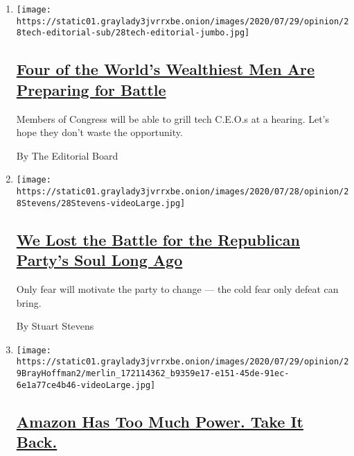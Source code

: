 \begin{enumerate}
\def\labelenumi{\arabic{enumi}.}
\item
  \texttt{[image: https://static01.graylady3jvrrxbe.onion/images/2020/07/29/opinion/28tech-editorial-sub/28tech-editorial-jumbo.jpg]}

  \hypertarget{four-of-the-worlds-wealthiest-men-are-preparing-for-battle}{%
  \subsection{\texorpdfstring{\href{/2020/07/28/opinion/tech-ceo-hearing-congress.html}{Four
  of the World's Wealthiest Men Are Preparing for
  Battle}}{Four of the World's Wealthiest Men Are Preparing for Battle}}\label{four-of-the-worlds-wealthiest-men-are-preparing-for-battle}}

  Members of Congress will be able to grill tech C.E.O.s at a hearing.
  Let's hope they don't waste the opportunity.

  By The Editorial Board
\item
  \texttt{[image: https://static01.graylady3jvrrxbe.onion/images/2020/07/28/opinion/28Stevens/28Stevens-videoLarge.jpg]}

  \hypertarget{we-lost-the-battle-for-the-republican-partys-soul-long-ago}{%
  \subsection{\texorpdfstring{\href{/2020/07/29/opinion/trump-republican-party-racism.html}{We
  Lost the Battle for the Republican Party's Soul Long
  Ago}}{We Lost the Battle for the Republican Party's Soul Long Ago}}\label{we-lost-the-battle-for-the-republican-partys-soul-long-ago}}

  Only fear will motivate the party to change --- the cold fear only
  defeat can bring.

  By Stuart Stevens
\item
  \texttt{[image: https://static01.graylady3jvrrxbe.onion/images/2020/07/29/opinion/29BrayHoffman2/merlin\_172114362\_b9359e17-e151-45de-91ec-6e1a77ce4b46-videoLarge.jpg]}

  \hypertarget{amazon-has-too-much-power-take-it-back}{%
  \subsection{\texorpdfstring{\href{/2020/07/29/opinion/amazon-union-congress-antitrust.html}{Amazon
  Has Too Much Power. Take It
  Back.}}{Amazon Has Too Much Power. Take It Back.}}\label{amazon-has-too-much-power-take-it-back}}


\end{enumerate}
